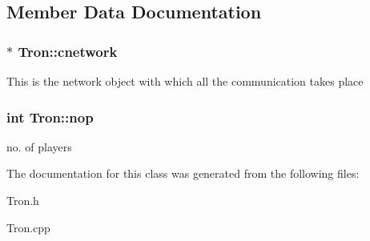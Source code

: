 \subsection{Member Data Documentation}
\hypertarget{class_tron_a9d1c7b1df7030845009908cf70c16e1a}{
\subsubsection[{cnetwork}]{$\ast$ Tron\-::cnetwork}}\label{class_tron_a9d1c7b1df7030845009908cf70c16e1a}
This is the network object with which all the communication takes place \hypertarget{class_tron_ad177bcd737ae99884f7dee2be6c92a72}{
\subsubsection[{nop}]{\setlength{\rightskip}{0pt plus 5cm}int Tron\-::nop}}\label{class_tron_ad177bcd737ae99884f7dee2be6c92a72}
no. of players 

The documentation for this class was generated from the following files\-:\begin{DoxyCompactItemize}
\item 
Tron.\-h\item 
Tron.\-cpp\end{DoxyCompactItemize}
